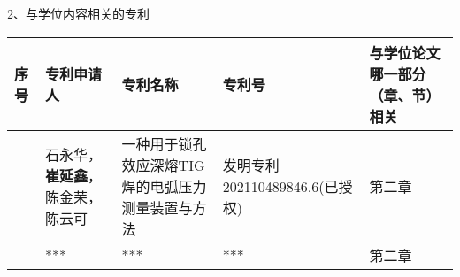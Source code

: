 2、与学位内容相关的专利

\begin{centering}
	\small
	\begin{longtable}{|>{\centering}m{0.5cm}|>{\centering}m{4cm}|>{\centering}m{3.5cm}|>{\centering}m{4cm}|>{\centering}m{2.2cm}|}
		\hline
		\textbf{序号}	&	\textbf{专利申请人}	&	\textbf{专利名称}	&	\textbf{专利号}	&	\textbf{与学位论文哪一部分（章、节）相关}\tabularnewline
		\hline
		1	& 石永华，\textbf{崔延鑫}，陈金荣，陈云可	&	一种用于锁孔效应深熔TIG焊的电弧压力测量装置与方法	&	发明专利202110489846.6(已授权)	& 第二章\tabularnewline
		\hline
		2	& ***	& 	***	& ***	& 第二章\tabularnewline
		\hline
	\end{longtable}
\end{centering}